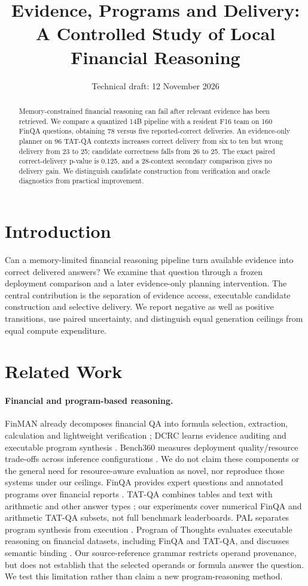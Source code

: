 \documentclass[10pt,letterpaper]{article}
\title{Evidence, Programs and Delivery: A Controlled Study of Local Financial Reasoning}
\author{}
\date{Technical draft: 12 November 2026}
\begin{document}
\maketitle
\begin{abstract}
Memory-constrained financial reasoning can fail after relevant evidence has been retrieved. We compare a quantized 14B pipeline with a resident F16 team on 160 FinQA questions, obtaining 78 versus five reported-correct deliveries. An evidence-only planner on 96 TAT-QA contexts increases correct delivery from six to ten but wrong delivery from 23 to 25; candidate correctness falls from 26 to 25. The exact paired correct-delivery p-value is 0.125, and a 28-context secondary comparison gives no delivery gain. We distinguish candidate construction from verification and oracle diagnostics from practical improvement.
\end{abstract}
\section{Introduction}
Can a memory-limited financial reasoning pipeline turn available evidence into correct delivered answers? We examine that question through a frozen deployment comparison and a later evidence-only planning intervention. The central contribution is the separation of evidence access, executable candidate construction and selective delivery. We report negative as well as positive transitions, use paired uncertainty, and distinguish equal generation ceilings from equal compute expenditure.
\section{Related Work}
\paragraph{Financial and program-based reasoning.}
FinMAN already decomposes financial QA into formula selection, extraction, calculation and lightweight verification \citep{finman}; DCRC learns evidence auditing and executable program synthesis \citep{dcrc}. Bench360 measures deployment quality/resource trade-offs across inference configurations \citep{bench360}. We do not claim these components or the general need for resource-aware evaluation as novel, nor reproduce those systems under our ceilings.
FinQA provides expert questions and annotated programs over financial reports \citep{finqa}. TAT-QA combines tables and text with arithmetic and other answer types \citep{tatqa}; our experiments cover numerical FinQA and arithmetic TAT-QA subsets, not full benchmark leaderboards. PAL separates program synthesis from execution \citep{pal}. Program of Thoughts evaluates executable reasoning on financial datasets, including FinQA and TAT-QA, and discusses semantic binding \citep{pot}. Our source-reference grammar restricts operand provenance, but does not establish that the selected operands or formula answer the question. We test this limitation rather than claim a new program-reasoning method.
\end{document}
